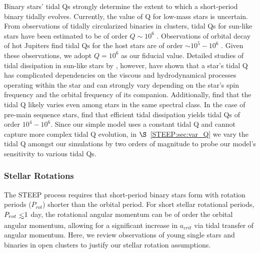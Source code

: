 Binary stars' tidal Qs strongly determine the extent to which a short-period binary tidally evolves.  Currently, the value of Q for low-mass stars is uncertain.  From observations of tidally circularized binaries in clusters, tidal Qs for sun-like stars have been estimated to be of order $Q{\sim}10^6$ \citep[e.g.][]{Meibom2005}.  Observations of orbital decay of hot Jupiters find tidal Qs for the host stars are of order ${\sim}10^5-10^6$ \citep{Jackson2009,Essick2016,Patra2017,Wilkins2017}.  Given these observations, we adopt $Q=10^6$ as our fiducial value.  Detailed studies of tidal dissipation in sun-like stars by \citet{Ogilvie2007}, however, have shown that a star's tidal Q has complicated dependencies on the viscous and hydrodynamical processes operating within the star and can strongly vary depending on the star's spin frequency and the orbital frequency of its companion.  Additionally, \citet{Barker2009} find that the tidal Q likely varies even among stars in the same spectral class.  In the case of pre-main sequence stars, \citet{Bolmont2016} find that efficient tidal dissipation yields tidal Qs of order $10^4-10^6$.  Since our simple model uses a constant tidal Q and cannot capture more complex tidal Q evolution, in $\S$~\ref{STEEP:sec:var_Q} we vary the tidal Q amongst our simulations by two orders of magnitude to probe our model's sensitivity to various tidal Qs.

\subsubsection{Stellar Rotations} \label{STEEP:sec:stellar_rotations}

The STEEP process requires that short-period binary stars form with rotation periods ($P_{rot}$) shorter than the orbital period.  For short stellar rotational periods, $P_{rot} \lsim 1$ day, the rotational angular momentum can be of order the orbital angular momentum, allowing for a significant increase in $a_{crit}$ via tidal transfer of angular momentum.  Here, we review observations of young single stars and binaries in open clusters to justify our stellar rotation assumptions.

